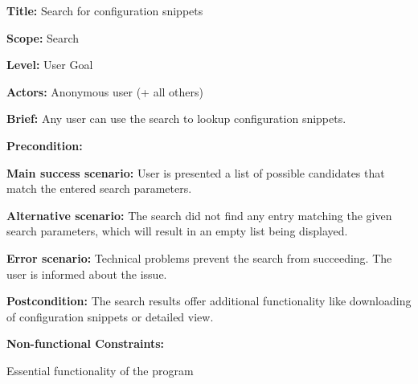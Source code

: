 
\begin{DoxyItemize}
\item {\bfseries Title\+:} Search for configuration snippets
\item {\bfseries Scope\+:} Search
\item {\bfseries Level\+:} User Goal
\item {\bfseries Actors\+:} Anonymous user (+ all others)
\item {\bfseries Brief\+:} Any user can use the search to lookup configuration snippets.
\end{DoxyItemize}


\begin{DoxyItemize}
\item {\bfseries Precondition\+:}
\item {\bfseries Main success scenario\+:} User is presented a list of possible candidates that match the entered search parameters.
\item {\bfseries Alternative scenario\+:} The search did not find any entry matching the given search parameters, which will result in an empty list being displayed.
\item {\bfseries Error scenario\+:} Technical problems prevent the search from succeeding. The user is informed about the issue.
\item {\bfseries Postcondition\+:} The search results offer additional functionality like downloading of configuration snippets or detailed view.
\item {\bfseries Non-\/functional Constraints\+:}
\begin{DoxyItemize}
\item Essential functionality of the program 
\end{DoxyItemize}
\end{DoxyItemize}